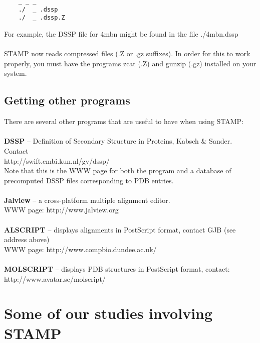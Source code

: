     \begin{scriptsize}\begin{verbatim}
    _ _ _
    ./  _ .dssp
    ./  _ .dssp.Z
    \end{verbatim} \end{scriptsize}

    For example, the DSSP file for 4mbn might be found in the file 
    ./4mbn.dssp\\
    \\
    STAMP now reads compressed files (.Z or .gz suffixes).  In order for this
    to work properly, you must have the programs zcat (.Z) and gunzip (.gz) installed
    on your system.

    \section{Getting other programs}

    There are several other programs that are useful to have when using STAMP:\\
    \\
    {\bf DSSP} -- Definition of Secondary Structure in Proteins, Kabsch \& Sander.  Contact\\
    http://swift.cmbi.kun.nl/gv/dssp/\\
    Note that this is the WWW page for both the program and a database of precomputed
    DSSP files corresponding to PDB entries.\\
    \\
    {\bf Jalview} -- a cross-platform multiple alignment editor.\\
    WWW page: http://www.jalview.org\\
    \\
    {\bf ALSCRIPT} -- displays alignments in PostScript format, contact GJB (see address above)\\
    WWW page: http://www.compbio.dundee.ac.uk/\\
    \\
    {\bf MOLSCRIPT} -- displays PDB structures in PostScript format, contact:\\
    http://www.avatar.se/molscript/\\

    \chapter{Some of our studies involving STAMP}

